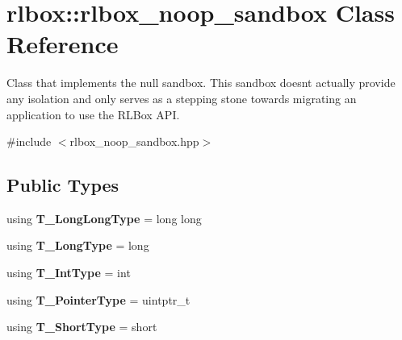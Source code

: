 \hypertarget{classrlbox_1_1rlbox__noop__sandbox}{}\section{rlbox\+:\+:rlbox\+\_\+noop\+\_\+sandbox Class Reference}
\label{classrlbox_1_1rlbox__noop__sandbox}


Class that implements the null sandbox. This sandbox doesn\textquotesingle{}t actually provide any isolation and only serves as a stepping stone towards migrating an application to use the R\+L\+Box A\+PI.  




{\ttfamily \#include $<$rlbox\+\_\+noop\+\_\+sandbox.\+hpp$>$}

\subsection*{Public Types}
\begin{DoxyCompactItemize}
\item 
\mbox{\label{classrlbox_1_1rlbox__noop__sandbox_a54dfd9239da9ce4bdc48486ce03dfff6}} 
using {\bfseries T\+\_\+\+Long\+Long\+Type} = long long
\item 
\mbox{\label{classrlbox_1_1rlbox__noop__sandbox_a6510f0a0d24a8af6f8b1ff759f9c27b1}} 
using {\bfseries T\+\_\+\+Long\+Type} = long
\item 
\mbox{\label{classrlbox_1_1rlbox__noop__sandbox_aad50443cb7733460ca536ffd553aad08}} 
using {\bfseries T\+\_\+\+Int\+Type} = int
\item 
\mbox{\label{classrlbox_1_1rlbox__noop__sandbox_a909dbb8c3226fbcd19171c0548f21acf}} 
using {\bfseries T\+\_\+\+Pointer\+Type} = uintptr\+\_\+t
\item 
\mbox{\label{classrlbox_1_1rlbox__noop__sandbox_a0bacaced018f138bf097b8e854c3ad5f}} 
using {\bfseries T\+\_\+\+Short\+Type} = short
\end{DoxyCompactItemize}
